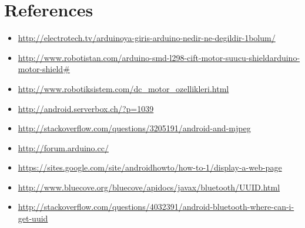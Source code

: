 \documentclass[11pt]{article}
\begin{document}
\pagebreak

\section{References}
\begin{itemize}
\item \url {http://electrotech.tv/arduinoya-giris-arduino-nedir-ne-degildir-1bolum/}
\item \url {http://www.robotistan.com/arduino-smd-l298-cift-motor-suucu-shieldarduino-motor-shield\#}
\item \url {http://www.robotiksistem.com/dc_motor_ozellikleri.html}
\item \url {http://android.serverbox.ch/?p=1039}
\item \url {http://stackoverflow.com/questions/3205191/android-and-mjpeg}
\item \url {http://forum.arduino.cc/}
\item \url {https://sites.google.com/site/androidhowto/how-to-1/display-a-web-page}
\item \url {http://www.bluecove.org/bluecove/apidocs/javax/bluetooth/UUID.html}
\item \url {http://stackoverflow.com/questions/4032391/android-bluetooth-where-can-i-get-uuid}

\end{itemize}
\end{document}
